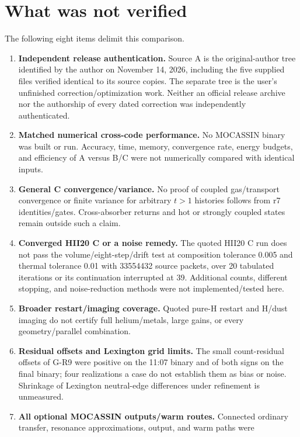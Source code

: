 \documentclass[english,a4paper]{my_memo}
\begin{document}
\clearpage
\section{What was not verified}
\label{sec:unknown}
The following eight items delimit this comparison.
\begin{enumerate}[leftmargin=2em,itemsep=5pt]
\item \textbf{Independent release authentication.} Source A is the
original-author tree identified by the author on November 14, 2026,
including the five supplied  files verified
identical to its source copies. The separate  tree is
the user's unfinished correction/optimization work. Neither an official
release archive nor the authorship of every dated correction was
independently authenticated.
\item \textbf{Matched numerical cross-code performance.} No MOCASSIN
binary was built or run. Accuracy, time, memory, convergence rate, energy
budgets, and efficiency of A versus B/C were not numerically compared
with identical inputs.
\item \textbf{General C convergence/variance.} No proof of coupled
gas/transport convergence or finite variance for arbitrary $t>1$
histories follows from r7 identities/gates. Cross-absorber returns and
hot or strongly coupled states remain outside such a claim.
\item \textbf{Converged HII20 C or a noise remedy.} The quoted HII20 C
run does not pass the volume/eight-step/drift test at composition tolerance
0.005 and thermal tolerance 0.01 with 33554432 source packets, over
20 tabulated iterations or its continuation interrupted at 39.
Additional counts, different stopping,
and noise-reduction methods were not implemented/tested here.
\item \textbf{Broader restart/imaging coverage.} Quoted pure-H restart
and H/dust imaging do not certify full helium/metals, large gains, or
every geometry/parallel combination.
\item \textbf{Residual offsets and Lexington grid limits.} The small
count-residual offsets of G-R9 were positive on the 11:07 binary and of
both signs on the final binary; four realizations a case do not establish
them as bias or noise. Shrinkage
of Lexington neutral-edge differences under refinement is unmeasured.
\item \textbf{All optional MOCASSIN outputs/warm routes.} Connected
ordinary transfer, resonance approximations, output, and warm paths were

\end{enumerate}
\end{document}
